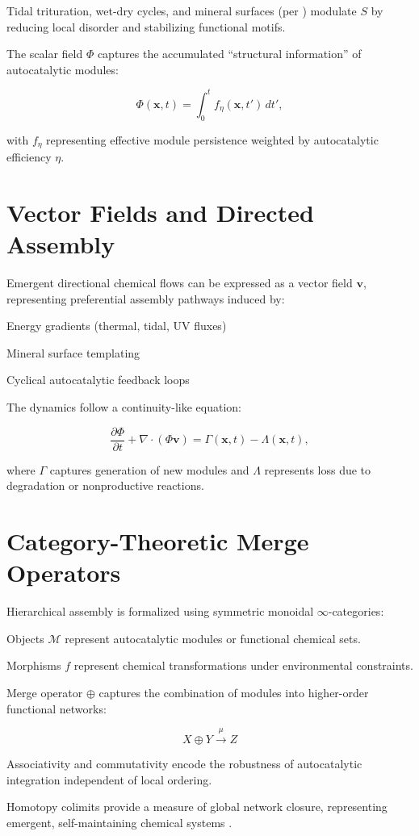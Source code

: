 \documentclass{book}
\begin{document}
Tidal trituration, wet-dry cycles, and mineral surfaces (per \citealt{hazen2005}) modulate $S$ by reducing local disorder and stabilizing functional motifs.

The scalar field $\Phi$ captures the accumulated “structural information” of autocatalytic modules:

\[\Phi(\mathbf{x}, t) = \int_0^t f_\eta(\mathbf{x}, t') \, dt',\]

with $f_\eta$ representing effective module persistence weighted by autocatalytic efficiency $\eta$.

\section{Vector Fields and Directed Assembly}
Emergent directional chemical flows can be expressed as a vector field $\mathbf{v}$, representing preferential assembly pathways induced by:

Energy gradients (thermal, tidal, UV fluxes)

Mineral surface templating \citep{hazen2005}

Cyclical autocatalytic feedback loops

The dynamics follow a continuity-like equation:

\[\frac{\partial \Phi}{\partial t} + \nabla \cdot (\Phi \mathbf{v}) = \Gamma(\mathbf{x}, t) - \Lambda(\mathbf{x}, t),\]

where $\Gamma$ captures generation of new modules and $\Lambda$ represents loss due to degradation or nonproductive reactions.

\section{Category-Theoretic Merge Operators}
Hierarchical assembly is formalized using symmetric monoidal $\infty$-categories:

Objects $\mathcal{M}$ represent autocatalytic modules or functional chemical sets.

Morphisms $f$ represent chemical transformations under environmental constraints.

Merge operator $\oplus$ captures the combination of modules into higher-order functional networks:

\[X \oplus Y \xrightarrow{\mu} Z\]

Associativity and commutativity encode the robustness of autocatalytic integration independent of local ordering.

Homotopy colimits provide a measure of global network closure, representing emergent, self-maintaining chemical systems \citep{steel2013}.
\end{document}
